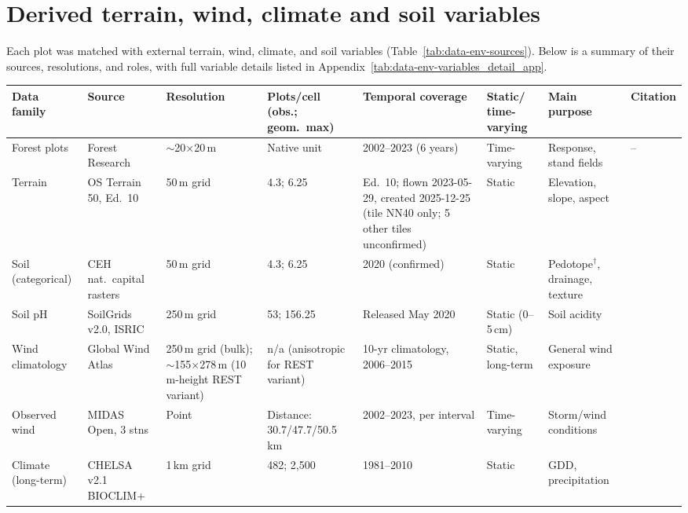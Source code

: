\documentclass[11pt,a4paper]{report}
\begin{document}
\section{Derived terrain, wind, climate and soil variables}
\label{sec:data-environmental}

Each plot was matched with external terrain, wind, climate, and soil variables (Table~\ref{tab:data-env-sources}). Below is a summary of their sources, resolutions, and roles, with full variable details listed in Appendix~\ref{tab:data-env-variables_detail_app}.

\begin{table}[!htbp]
\tiny
\setlength{\tabcolsep}{2pt}
\renewcommand{\arraystretch}{0.9}
\begin{tabular}{p{1.6cm}p{2.1cm}p{1.6cm}p{1.5cm}p{2.3cm}p{1.6cm}p{2.3cm}p{0.7cm}}
\hline
Data family & Source & Resolution & Plots/cell (obs.; geom.\ max) & Temporal coverage & Static/ time-varying & Main purpose & Citation \\
\hline
Forest plots & Forest Research & $\sim$20$\times$20\,m & Native unit & 2002--2023 (6 years) & Time-varying & Response, stand fields & -- \\
Terrain & OS Terrain 50, Ed.\ 10 & 50\,m grid & 4.3; 6.25 & Ed.\ 10; flown 2023-05-29, created 2025-12-25 (tile NN40 only; 5 other tiles unconfirmed) & Static & Elevation, slope, aspect & \cite{ordnancesurveyTerrain50_C3_LID} \\
Soil (categorical) & CEH nat.\ capital rasters & 50\,m grid & 4.3; 6.25 & 2020 (confirmed) & Static & Pedotope$^{\dagger}$, drainage, texture & \cite{feeney2026CEHNaturalCapital_C3_LID} \\
Soil pH & SoilGrids v2.0, ISRIC & 250\,m grid & 53; 156.25 & Released May 2020 & Static (0--5\,cm) & Soil acidity & \cite{poggio2021SoilGrids_C3_LID} \\
Wind climatology & Global Wind Atlas & 250\,m grid (bulk); $\sim$155$\times$278\,m (10\,m-height REST variant) & n/a (anisotropic for REST variant) & 10-yr climatology, 2006--2015 & Static, long-term & General wind exposure & \cite{davis2023GlobalWindAtlas_C3_LID} \\
Observed wind & MIDAS Open, 3 stns & Point & Distance: 30.7/47.7/50.5\,km & 2002--2023, per interval & Time-varying & Storm/wind conditions & \cite{metoffice2019MIDASOpen_C3_LID} \\
Climate (long-term) & CHELSA v2.1 BIOCLIM+ & 1\,km grid & 482; 2{,}500 & 1981--2010 & Static & GDD, precipitation & \cite{karger2017CHELSA_C3_LID} \\

\end{tabular}
\end{table}
\end{document}
